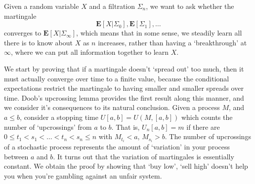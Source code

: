 \begin{example}
    Given a random variable $X$ and a filtration $\Sigma_n$, we want to ask whether the martingale
    \[ \mathbf{E}[X|\Sigma_0], \mathbf{E}[\Sigma_1], \dots \]
    converges to $\mathbf{E}[X|\Sigma_\infty]$, which means that in some sense, we steadily learn all there is to know about $X$ as $n$ increases, rather than having a `breakthrough' at $\infty$, where we can put all information together to learn $X$.
\end{example}

We start by proving that if a martingale doesn't `spread out' too much, then it must actually converge over time to a finite value, because the conditional expectations restrict the martingale to having smaller and smaller spreads over time. Doob's upcrossing lemma provides the first result along this manner, and we consider it's consequences to its natural conclusion. Given a process $M$, and $a \leq b$, consider a stopping time $U[a,b] = U(M,[a,b])$ which counts the number of `upcrossings' from $a$ to $b$. That is, $U_n[a,b] = m$ if there are $0 \leq t_1 < s_1 < \dots < t_n < s_n \leq n$ with $M_{t_i} < a$, $M_{s_i} > b$. The number of upcrossings of a stochastic process represents the amount of `variation' in your process between $a$ and $b$. It turns out that the variation of martingales is essentially constant. We obtain the proof by showing that `buy low', `sell high' doesn't help you when you're gambling against an unfair system.

